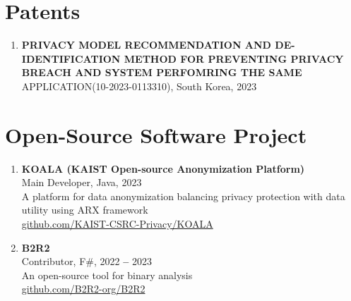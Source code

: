 \documentclass[letterpaper,11pt]{article}
\newcommand{\resumeItem}[1]{
  \item\small{
    {#1 \vspace{-2pt}}
  }
}
\newcommand{\paperListStart}{\begin{enumerate}}
\newcommand{\paperListEnd}{\end{enumerate}\vspace{-5pt}}
\begin{document}

\section{Patents}
  \vspace{3pt}
  \paperListStart
    \resumeItem
      {\textbf{PRIVACY MODEL RECOMMENDATION AND DE-IDENTIFICATION METHOD FOR PREVENTING PRIVACY BREACH AND SYSTEM PERFOMRING THE SAME}\\APPLICATION(10-2023-0113310), South Korea, 2023}
  \paperListEnd




\section{Open-Source Software Project}
\vspace{3pt}
\paperListStart
  \resumeItem
    {\textbf{KOALA (KAIST Open-source Anonymization Platform)} \\
    Main Developer, Java, 2023\\
    A platform for data anonymization balancing privacy protection with data utility using ARX framework \\
    \faGithub \hspace{.5pt} \href{https://github.com/KAIST-CSRC-Privacy/KOALA}{github.com/KAIST-CSRC-Privacy/KOALA}}
  \resumeItem
    {\textbf{B2R2} \\
    Contributor, F\#, 2022 \textbf{--} 2023 \\
    An open-source tool for binary analysis \\
    \faGithub \hspace{.5pt} \href{https://github.com/B2R2-org/B2R2}{github.com/B2R2-org/B2R2}}
\paperListEnd


\end{document}
